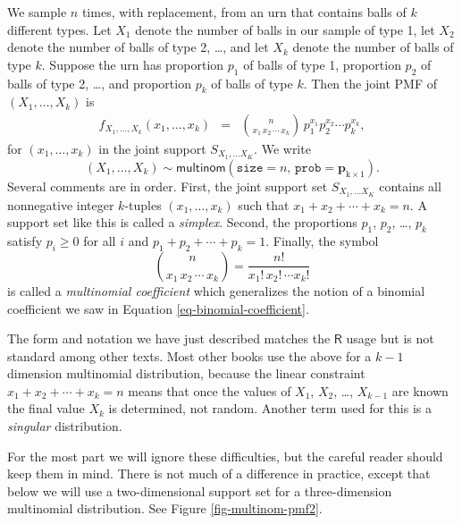 \documentclass[captions=tableheading]{scrbook}
\begin{document}
We sample \(n\) times, with replacement, from an urn that contains balls of \(k\) different types. Let \(X_{1}\) denote the number of balls in our sample of type 1, let \(X_{2}\) denote the number of balls of type 2, \ldots{}, and let \(X_{k}\) denote the number of balls of type \(k\). Suppose the urn has proportion \(p_{1}\) of balls of type 1, proportion \(p_{2}\) of balls of type 2, \ldots{}, and proportion \(p_{k}\) of balls of type \(k\). Then the joint PMF of \((X_{1},\ldots,X_{k})\) is
\begin{eqnarray}
f_{X_{1},\ldots,X_{k}}(x_{1},\ldots,x_{k}) & = & {n \choose x_{1}\, x_{2}\,\cdots\, x_{k}}\, p_{1}^{x_{1}}p_{2}^{x_{2}}\cdots p_{k}^{x_{k}},
\end{eqnarray}
for \((x_{1},\ldots,x_{k})\) in the joint support \(S_{X_{1},\ldots X_{K}}\). We write
\begin{equation}
(X_{1},\ldots,X_{k})\sim\mathsf{multinom}(\mathtt{size}=n,\,\mathtt{prob}=\mathbf{p}_{\mathrm{k}\times1}).
\end{equation}
Several comments are in order. First, the joint support set \(S_{X_{1},\ldots X_{K}}\) contains all nonnegative integer \(k\)-tuples \((x_{1},\ldots,x_{k})\) such that \(x_{1}+x_{2}+\cdots+x_{k}=n\). A support set like this is called a \emph{simplex}. Second, the proportions \(p_{1}\), \(p_{2}\), \ldots{}, \(p_{k}\) satisfy \(p_{i}\geq0\) for all \(i\) and \(p_{1}+p_{2}+\cdots+p_{k}=1\). Finally, the symbol
\begin{equation}
{n \choose x_{1}\, x_{2}\,\cdots\, x_{k}}=\frac{n!}{x_{1}!\, x_{2}!\,\cdots x_{k}!}
\end{equation}
is called a \emph{multinomial coefficient} which generalizes the notion of a binomial coefficient we saw in Equation \ref{eq-binomial-coefficient}. 

The form and notation we have just described matches the \(\mathsf{R}\) usage but is not standard among other texts. Most other books use the above for a \(k-1\) dimension multinomial distribution, because the linear constraint \(x_{1}+x_{2}+\cdots+x_{k}=n\) means that once the values of \(X_{1}\), \(X_{2}\), \ldots{}, \(X_{k-1}\) are known the final value \(X_{k}\) is determined, not random. Another term used for this is a \emph{singular} distribution. 

For the most part we will ignore these difficulties, but the careful reader should keep them in mind. There is not much of a difference in practice, except that below we will use a two-dimensional support set for a three-dimension multinomial distribution. See Figure \ref{fig-multinom-pmf2}.
\end{document}
